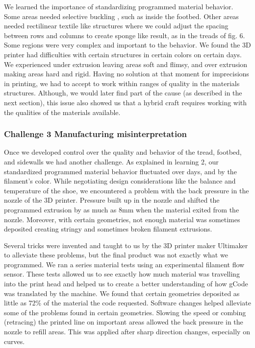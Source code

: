 We learned the importance of standardizing programmed material behavior. Some areas needed selective buckling \cite{Paulose2015}, such as inside the footbed. Other areas needed rectilinear textile like structures where we could adjust the spacing between rows and columns to create sponge like result, as in the treads of fig. 6. Some regions were very complex and important to the behavior. We found the 3D printer had difficulties with certain structures in certain colors on certain days. We experienced under extrusion leaving areas soft and flimsy, and over extrusion making areas hard and rigid. Having no solution at that moment for  imprecisions in printing, we had to accept to work within ranges of quality in the materials structures. Although, we would later find part of the cause (as described in the next section), this issue also showed us that a hybrid craft requires working with the qualities of the materials available. 

\subsubsection{Challenge 3 Manufacturing misinterpretation}

Once we developed control over the quality and behavior of the tread, footbed, and sidewalls we had another challenge. As explained in learning 2, our standardized programmed material behavior fluctuated over days, and by the filament's color. While negotiating design considerations like the balance and temperature of the shoe, we encountered a problem with the back pressure in the nozzle of the 3D printer. Pressure built up in the nozzle and shifted the programmed extrusion by as much as 8mm when the material exited from the nozzle. Moreover, with certain geometries, not enough material was sometimes deposited creating stringy and sometimes broken filament extrusions. 

Several tricks were invented and taught to us by the 3D printer maker Ultimaker to alleviate these problems, but the final product was not exactly what we programmed. We ran a series material tests using an experimental filament flow sensor. These tests allowed us to see exactly how much material was travelling into the print head and helped us to create a better understanding of how gCode was translated by the machine. We found that certain geometries deposited as little as 72\% of the material the code requested. Software changes helped alleviate some of the problems found in certain geometries. Slowing the speed or combing (retracing) the printed line on important areas allowed the back pressure in the nozzle to refill areas. This was applied after sharp direction changes, especially on curves.

